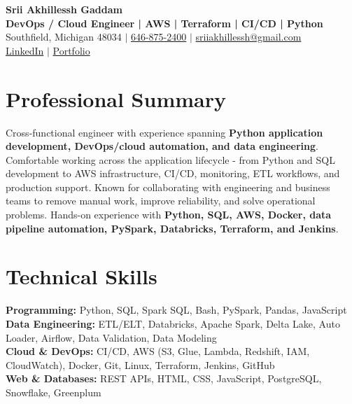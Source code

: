 \documentclass[letterpaper,10pt]{article}
\begin{document}
\fontsize{9.35pt}{10.45pt}\selectfont

\begin{center}
    {\LARGE \textbf{Srii Akhillessh Gaddam}} \\[-1pt]
    \textbf{DevOps / Cloud Engineer | AWS | Terraform | CI/CD | Python} \\[2pt]
    Southfield, Michigan 48034 $|$
    \href{tel:6468752400}{646-875-2400} $|$
    \href{mailto:sriiakhillessh@gmail.com}{sriiakhillessh@gmail.com} \\[1pt]
    \href{https://www.linkedin.com/in/srii-akhiilessh-gaddam-b48668191/}{LinkedIn} $|$
    \href{https://sriiakhillesshg.github.io/portfolio/}{Portfolio}
\end{center}
\vspace{-8pt}

\section{Professional Summary}
\small{Cross-functional engineer with experience spanning \textbf{Python application development, DevOps/cloud automation, and data engineering}. Comfortable working across the application lifecycle - from Python and SQL development to AWS infrastructure, CI/CD, monitoring, ETL workflows, and production support. Known for collaborating with engineering and business teams to remove manual work, improve reliability, and solve operational problems. Hands-on experience with \textbf{Python, SQL, AWS, Docker, data pipeline automation, PySpark, Databricks, Terraform, and Jenkins}.}

\section{Technical Skills}
\small{
\textbf{Programming:} Python, SQL, Spark SQL, Bash, PySpark, Pandas, JavaScript \\
\textbf{Data Engineering:} ETL/ELT, Databricks, Apache Spark, Delta Lake, Auto Loader, Airflow, Data Validation, Data Modeling \\
\textbf{Cloud \& DevOps:} CI/CD, AWS (S3, Glue, Lambda, Redshift, IAM, CloudWatch), Docker, Git, Linux, Terraform, Jenkins, GitHub \\
\textbf{Web \& Databases:} REST APIs, HTML, CSS, JavaScript, PostgreSQL, Snowflake, Greenplum
}
\end{document}
